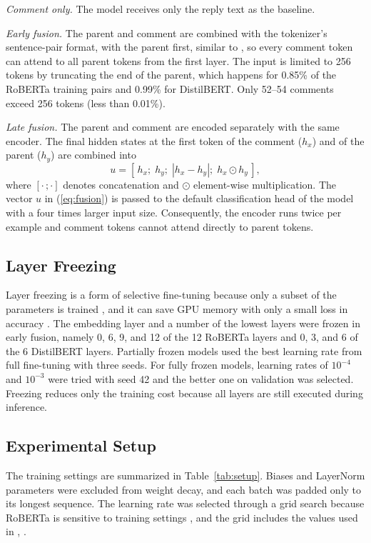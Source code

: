 \documentclass[conference]{IEEEtran}
\begin{document}
\textit{Comment only.} The model receives only the reply text as the baseline.

\textit{Early fusion.} The parent and comment are combined with the tokenizer's sentence-pair format, with the parent first, similar to \cite{ataeii2020transformers}, so every comment token can attend to all parent tokens from the first layer. The input is limited to 256 tokens by truncating the end of the parent, which happens for 0.85\% of the RoBERTa training pairs and 0.99\% for DistilBERT. Only 52--54 comments exceed 256 tokens (less than 0.01\%).

\textit{Late fusion.} The parent and comment are encoded separately with the same encoder. The final hidden states at the first token of the comment ($h_x$) and of the parent ($h_y$) are combined into
\begin{equation}
u = [\,h_x;\; h_y;\; |h_x - h_y|;\; h_x \odot h_y\,],
\label{eq:fusion}
\end{equation}
where $[\cdot\,;\cdot]$ denotes concatenation and $\odot$ element-wise multiplication. The vector $u$ in (\ref{eq:fusion}) is passed to the default classification head of the model with a four times larger input size. Consequently, the encoder runs twice per example and comment tokens cannot attend directly to parent tokens.

\subsection{Layer Freezing}
Layer freezing is a form of selective fine-tuning because only a subset of the parameters is trained \cite{han2024peft}, and it can save GPU memory with only a small loss in accuracy \cite{ardakani2024slimfit}. The embedding layer and a number of the lowest layers were frozen in early fusion, namely 0, 6, 9, and 12 of the 12 RoBERTa layers and 0, 3, and 6 of the 6 DistilBERT layers. Partially frozen models used the best learning rate from full fine-tuning with three seeds. For fully frozen models, learning rates of $10^{-4}$ and $10^{-3}$ were tried with seed 42 and the better one on validation was selected. Freezing reduces only the training cost because all layers are still executed during inference.

\subsection{Experimental Setup}
The training settings are summarized in Table~\ref{tab:setup}. Biases and LayerNorm parameters were excluded from weight decay, and each batch was padded only to its longest sequence. The learning rate was selected through a grid search because RoBERTa is sensitive to training settings \cite{jimenez2026bert}, and the grid includes the values used in \cite{dubey2026efficient}, \cite{ullah2026advanced}.
\end{document}
